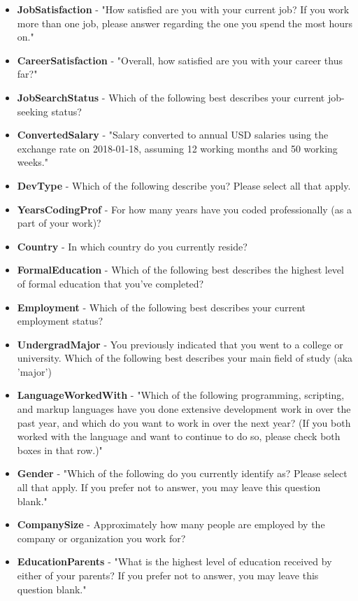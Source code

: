 \begin{appendices}
    \begin{itemize}
        \item \textbf{JobSatisfaction} - "How satisfied are you with your current job? If you work more than one job, please answer regarding the one you spend the most hours on."
        \item \textbf{CareerSatisfaction} - "Overall, how satisfied are you with your career thus far?"
        \item \textbf{JobSearchStatus} - Which of the following best describes your current job-seeking status?
        \item \textbf{ConvertedSalary} - "Salary converted to annual USD salaries using the exchange rate on 2018-01-18, assuming 12 working months and 50 working weeks."
        \item \textbf{DevType} - Which of the following describe you? Please select all that apply.
        \item \textbf{YearsCodingProf} - For how many years have you coded professionally (as a part of your work)?
        \item \textbf{Country} - In which country do you currently reside?
        \item \textbf{FormalEducation} - Which of the following best describes the highest level of formal education that you’ve completed?
        \item \textbf{Employment} - Which of the following best describes your current employment status?
        \item \textbf{UndergradMajor} - You previously indicated that you went to a college or university. Which of the following best describes your main field of study (aka 'major')
        \item \textbf{LanguageWorkedWith} - "Which of the following programming, scripting, and markup languages have you done extensive development work in over the past year, and which do you want to work in over the next year?  (If you both worked with the language and want to continue to do so, please check both boxes in that row.)"
        \item \textbf{Gender} - "Which of the following do you currently identify as? Please select all that apply. If you prefer not to answer, you may leave this question blank."
        \item \textbf{CompanySize} - Approximately how many people are employed by the company or organization you work for?
        \item \textbf{EducationParents} - "What is the highest level of education received by either of your parents? If you prefer not to answer, you may leave this question blank."

\end{itemize}
\end{appendices}
